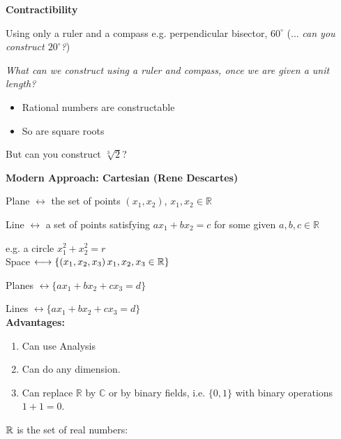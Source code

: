 \documentclass[10pt]{scrartcl}
\begin{document}
\textbf{Contractibility} 

Using only a ruler and a compass e.g. perpendicular bisector, $60^\circ$ (...\emph{ can you construct $20^\circ$?})  

\emph{What can we construct using a ruler and compass, once we are given a unit length?}

\begin{itemize}
\item Rational numbers are constructable	
\item So are square roots
\end{itemize}
\vspace{-10pt}
\begin{center}
\end{center}
\vspace*{-10pt}
But can you construct $\sqrt[3]{2}$?

\textbf{Modern Approach: Cartesian (Rene Descartes)} 

Plane $\longleftrightarrow$ the set of points $(x_1,x_2)$, $x_1,x_2 \in \mathbb{R}$

Line $\longleftrightarrow$ a set of points satisfying $ax_1 + bx_2 = c$ for some given $a,b,c \in \mathbb{R}$

e.g. a circle  $x_1^2 + x_2^2 = r$\\

Space $\longleftrightarrow \{(x_1,x_2,x_3)\, x_1,x_2,x_3 \in\mathbb{R}\}$

Planes $\longleftrightarrow \{ax_1 + bx_2 + cx_3 = d\}$

Lines $\longleftrightarrow \{ax_1 + bx_2 + cx_3 = d\}$\\

\textbf{Advantages:}
\begin{enumerate}
\item Can use Analysis
\item Can do any dimension. 
\item Can replace $\mathbb{R}$ by $\mathbb{C}$ or by binary fields, i.e. $\{0,1\}$ with binary operations $1+1 = 0$. 
\end{enumerate}



 $\mathbb{R}$ is the set of real numbers:
 \begin{center}
 \end{center}
\end{document}
